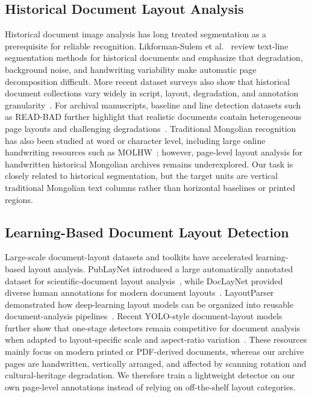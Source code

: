 \documentclass[12pt]{article}
\begin{document}
\subsection{Historical Document Layout Analysis}
Historical document image analysis has long treated segmentation as a prerequisite for reliable recognition. Likforman-Sulem et al.~\cite{likforman2007textline} review text-line segmentation methods for historical documents and emphasize that degradation, background noise, and handwriting variability make automatic page decomposition difficult. More recent dataset surveys also show that historical document collections vary widely in script, layout, degradation, and annotation granularity~\cite{nikolaidou2022survey}. For archival manuscripts, baseline and line detection datasets such as READ-BAD further highlight that realistic documents contain heterogeneous page layouts and challenging degradations~\cite{gruning2017readbad}. Traditional Mongolian recognition has also been studied at word or character level, including large online handwriting resources such as MOLHW~\cite{pan2023molhw}; however, page-level layout analysis for handwritten historical Mongolian archives remains underexplored. Our task is closely related to historical segmentation, but the target units are vertical traditional Mongolian text columns rather than horizontal baselines or printed regions.

\subsection{Learning-Based Document Layout Detection}
Large-scale document-layout datasets and toolkits have accelerated learning-based layout analysis. PubLayNet introduced a large automatically annotated dataset for scientific-document layout analysis~\cite{zhong2019publaynet}, while DocLayNet provided diverse human annotations for modern document layouts~\cite{pfitzmann2022doclaynet}. LayoutParser demonstrated how deep-learning layout models can be organized into reusable document-analysis pipelines~\cite{shen2021layoutparser}. Recent YOLO-style document-layout models further show that one-stage detectors remain competitive for document analysis when adapted to layout-specific scale and aspect-ratio variation~\cite{deng2023yolo, zhao2024doclayout}. These resources mainly focus on modern printed or PDF-derived documents, whereas our archive pages are handwritten, vertically arranged, and affected by scanning rotation and cultural-heritage degradation. We therefore train a lightweight detector on our own page-level annotations instead of relying on off-the-shelf layout categories.
\end{document}
